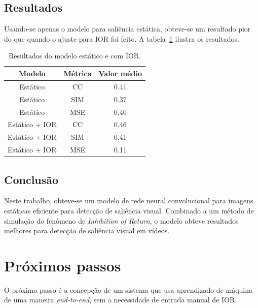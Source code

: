 \documentclass[article]{IEEEtran}
\newcommand{\tit}[1]{\textit{#1}}
\begin{document}
\subsection{Resultados}
Usando-se apenas o modelo para saliência estática, obteve-se um resultado
pior do que quando o ajuste para IOR foi feito.
A tabela~\ref{table:results} ilustra os resultados.

\begin{table}
\centering
	\small
\label{table:results}
\caption{Resultados do modelo estático e com IOR.}
\begin{tabular}{|c|c|c|}
	\hline
    Modelo & Métrica & Valor médio\\
    \hline
    Estático & CC & 0.41\\
    \hline
    Estático & SIM & 0.37\\
    \hline
    Estático & MSE & 0.40\\
    \hline
    Estático + IOR & CC & 0.46\\
    \hline
    Estático + IOR & SIM & 0.41\\
    \hline
    Estático + IOR & MSE & 0.11\\
    \hline
\end{tabular}
\end{table}

\subsection{Conclusão}
Neste trabalho, obteve-se um modelo de rede neural convolucional para
imagens estáticas eficiente para detecção de saliência visual.
Combinado a um método de simulação do fenômeno de \tit{Inhibition of Return},
o modelo obteve resultados melhores para detecção de saliência visual
em vídeos.

\section{Próximos passos}
O próximo passo é a concepção de um sistema que usa aprendizado de máquina
de uma maneira \tit{end-to-end}, sem a necessidade de entrada manual de
IOR.

\printbibliography

\end{document}
